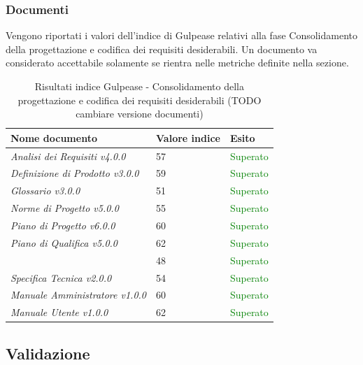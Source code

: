 	 	\subsubsection{Documenti}	 	
	 	Vengono riportati i valori dell'indice di Gulpease relativi alla fase Consolidamento della progettazione e codifica dei requisiti desiderabili. Un documento va considerato accettabile solamente se rientra nelle metriche definite nella sezione.
		\begin{table}[!ht]
			\begin{center}
				\begin{tabularx}{0.9\textwidth}{|l|l|X|}
					\hline
					\textbf{Nome documento} & \textbf{Valore indice} & \textbf{Esito}\\
					\hline						
					\emph{Analisi dei Requisiti v4.0.0} & 57 & \textcolor{green}{Superato}\\
					\hline
					\emph{Definizione di Prodotto v3.0.0} & 59 & \textcolor{green}{Superato}\\
					\hline
					\emph{Glossario v3.0.0} & 51 & \textcolor{green}{Superato}\\
					\hline					
					\emph{Norme di Progetto v5.0.0} & 55 & \textcolor{green}{Superato}\\
					\hline					
					\emph{Piano di Progetto v6.0.0} & 60 & \textcolor{green}{Superato}\\
					\hline					
					\emph{Piano di Qualifica v5.0.0} & 62 & \textcolor{green}{Superato}\\
					\hline					
					\docNameVersionSdF & 48 & \textcolor{green}{Superato}\\
					\hline	
					\emph{Specifica Tecnica v2.0.0} & 54 & \textcolor{green}{Superato}\\
					\hline
					\emph{Manuale Amministratore v1.0.0} & 60 & \textcolor{green}{Superato}\\
					\hline
					\emph{Manuale Utente v1.0.0} & 62 & \textcolor{green}{Superato}\\			
					\hline	
					\hline			
				\end{tabularx}
			\end{center}
			\caption{Risultati indice Gulpease - Consolidamento della progettazione e codifica dei requisiti desiderabili (TODO cambiare versione documenti)}
		\end{table}

	\subsection{Validazione}
